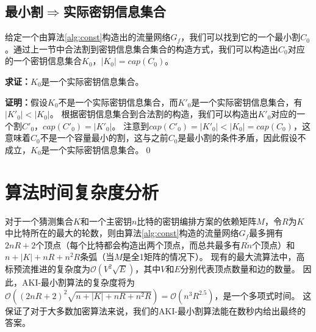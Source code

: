 \subsection{最小割$\Rightarrow$实际密钥信息集合}
给定一个由算法\ref{alg:const}构造出的流量网络$G_f$，我们可以找到它的一个最小割$C_0$。通过上一节中合法割到密钥信息集合集合的构造方式，我们可以构造出$C_0$对应的一个密钥信息集合$K_0$，$|K_0|=cap(C_0)$。

\noindent
\textbf{求证：}$K_0$是一个实际密钥信息集合。

\noindent
\textbf{证明：}假设$K_0$不是一个实际密钥信息集合，而$K'_0$是一个实际密钥信息集合，有$|K'_0|<|K_0|$。
根据密钥信息集合到合法割的构造，我们可以构造出$K'_0$对应的一个割$C'_0$，$cap(C'_0)=|K'_0|$。
注意到$cap(C'_0)=|K'_0|<|K_0|=cap(C_0)$，这意味着$C_0$不是一个容量最小的割，这与之前$C_0$是最小割的条件矛盾，因此假设不成立，$K_0$是一个实际密钥信息集合。\qed

\section{算法时间复杂度分析}
对于一个猜测集合$K$和一个主密钥$n$比特的密钥编排方案的依赖矩阵$M$，令$R$为$K$中比特所在的最大的轮数，则由算法\ref{alg:const}构造的流量网络$G_f$最多拥有$2nR+2$个顶点（每个比特都会构造出两个顶点，而总共最多有$R\dot n$个顶点）和$n+|K|+nR+n^2R$条弧（当$M$是全1矩阵的情况下）。
现有的最大流算法中，高标预流推进的复杂度为$\mathcal{O}(V^2\sqrt{E})$，其中$V$和$E$分别代表顶点数量和边的数量。
因此，AKI-最小割算法的复杂度将为$\mathcal{O}((2nR+2)^2\sqrt{n+|K|+nR+n^2R})=\mathcal{O}(n^3R^{2.5})$，是一个多项式时间。
这保证了对于大多数加密算法来说，我们的AKI-最小割算法能在数秒内给出最终的答案。
